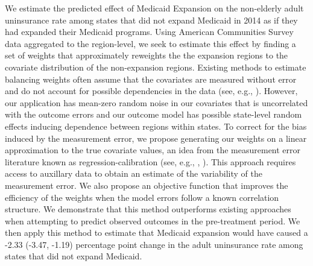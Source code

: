 \documentclass[aoas]{imsart}
\theoremstyle{plain}
\theoremstyle{remark}
\begin{document}
\begin{frontmatter}
\begin{flushleft}
We estimate the predicted effect of Medicaid Expansion on the non-elderly adult uninsurance rate among states that did not expand Medicaid in 2014 as if they had expanded their Medicaid programs. Using American Communities Survey data aggregated to the region-level, we seek to estimate this effect by finding a set of weights that approximately reweights the the expansion regions to the covariate distribution of the non-expansion regions. Existing methods to estimate balancing weights often assume that the covariates are measured without error and do not account for possible dependencies in the data (see, e.g., \cite{zubizarreta2015stable}). However, our application has mean-zero random noise in our covariates that is uncorrelated with the outcome errors and our outcome model has possible state-level random effects inducing dependence between regions within states. To correct for the bias induced by the measurement error, we propose generating our weights on a linear approximation to the true covariate values, an idea from the measurement error literature known as regression-calibration (see, e.g., \cite{gleser1992importance}, \cite{carroll2006measurement}). This approach requires access to auxillary data to obtain an estimate of the variability of the measurement error. We also propose an objective function that improves the efficiency of the weights when the model errors follow a known correlation structure. We demonstrate that this method outperforms existing approaches when attempting to predict observed outcomes in the pre-treatment period. We then apply this method to estimate that Medicaid expansion would have caused a -2.33 (-3.47, -1.19) percentage point change in the adult uninsurance rate among states that did not expand Medicaid.
\end{flushleft}


\begin{keyword}
\end{keyword}

\end{frontmatter}

\end{document}
